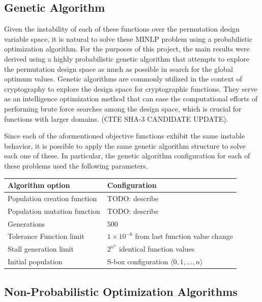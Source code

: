 \documentclass[11pt]{article}
\begin{document}
\subsection{Genetic Algorithm}

Given the instability of each of these functions over the permutation design variable space, it is natural to solve these MINLP problem using a probabilistic optimization algorithm. For the purposes of this project, the main results were derived using a highly probabilistic genetic algorithm that attempts to explore the permutation design space as much as possible in search for the global optimum values. Genetic algorithms are commonly utilized in the context of cryptography to explore the design space for cryptographic functions. They serve as an intelligence optimization method that can ease the computational efforts of performing brute force searches among the design space, which is crucial for functions with larger domains. (CITE SHA-3 CANDIDATE UPDATE).

Since each of the aformentioned objective functions exhibit the same instable behavior, it is possible to apply the same genetic algorithm structure to solve each one of these. In particular, the genetic algorithm configuration for each of these problems used the following parameters.

\begin{table}
	\centering
    \begin{tabular}{|l|l|}
        \hline
        \textbf{Algorithm option} & \textbf{Configuration} \\ \hline
        Population creation function & TODO: describe \\ 
        Population mutation function & TODO: describe \\ 
        Generations & $500$ \\ 
        Tolerance Function limit & $1 \times 10^{-6}$ from last function value change \\ 
        Stall generation limit & $2^{n^n}$ identical function values \\ 
        Initial population & S-box configuration $\langle 0, 1, ..., n \rangle$ \\
        \hline
    \end{tabular}
\end{table}

\subsection{Non-Probabilistic Optimization Algorithms}
\end{document}
